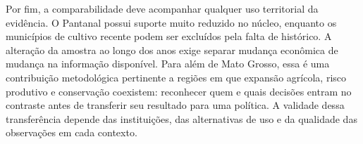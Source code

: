 Por fim, a comparabilidade deve acompanhar qualquer uso territorial da evidência. O Pantanal possui suporte muito reduzido no núcleo, enquanto os municípios de cultivo recente podem ser excluídos pela falta de histórico. A alteração da amostra ao longo dos anos exige separar mudança econômica de mudança na informação disponível. Para além de Mato Grosso, essa é uma contribuição metodológica pertinente a regiões em que expansão agrícola, risco produtivo e conservação coexistem: reconhecer quem e quais decisões entram no contraste antes de transferir seu resultado para uma política. A validade dessa transferência depende das instituições, das alternativas de uso e da qualidade das observações em cada contexto.
